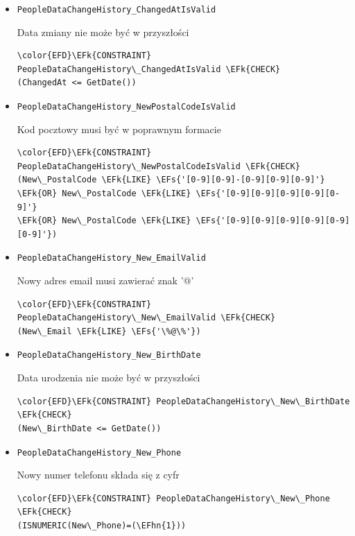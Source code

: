 \documentclass[11pt]{article}
\newcommand{\EFs}[1]{\textcolor{EFs}{#1}} %
\newcommand{\EFk}[1]{\textcolor{EFk}{\textbf{#1}}} %
\newcommand{\EFhn}[1]{\textcolor{EFhn}{#1}} %
\begin{document}
\begin{itemize}
\item \texttt{PeopleDataChangeHistory\_ChangedAtIsValid}

Data zmiany nie może być w przyszłości
\begin{Code}
\begin{Verbatim}
\color{EFD}\EFk{CONSTRAINT} PeopleDataChangeHistory\_ChangedAtIsValid \EFk{CHECK}
(ChangedAt <= GetDate())
\end{Verbatim}
\end{Code}
\item \texttt{PeopleDataChangeHistory\_NewPostalCodeIsValid}

Kod pocztowy musi być w poprawnym formacie
\begin{Code}
\begin{Verbatim}
\color{EFD}\EFk{CONSTRAINT} PeopleDataChangeHistory\_NewPostalCodeIsValid \EFk{CHECK}
(New\_PostalCode \EFk{LIKE} \EFs{'[0-9][0-9]-[0-9][0-9][0-9]'}
\EFk{OR} New\_PostalCode \EFk{LIKE} \EFs{'[0-9][0-9][0-9][0-9][0-9]'}
\EFk{OR} New\_PostalCode \EFk{LIKE} \EFs{'[0-9][0-9][0-9][0-9][0-9][0-9]'})
\end{Verbatim}
\end{Code}
\item \texttt{PeopleDataChangeHistory\_New\_EmailValid}

Nowy adres email musi zawierać znak '@'
\begin{Code}
\begin{Verbatim}
\color{EFD}\EFk{CONSTRAINT} PeopleDataChangeHistory\_New\_EmailValid \EFk{CHECK}
(New\_Email \EFk{LIKE} \EFs{'\%@\%'})
\end{Verbatim}
\end{Code}
\item \texttt{PeopleDataChangeHistory\_New\_BirthDate}

Data urodzenia nie może być w przyszłości
\begin{Code}
\begin{Verbatim}
\color{EFD}\EFk{CONSTRAINT} PeopleDataChangeHistory\_New\_BirthDate \EFk{CHECK}
(New\_BirthDate <= GetDate())
\end{Verbatim}
\end{Code}
\item \texttt{PeopleDataChangeHistory\_New\_Phone}

Nowy numer telefonu składa się z cyfr
\begin{Code}
\begin{Verbatim}
\color{EFD}\EFk{CONSTRAINT} PeopleDataChangeHistory\_New\_Phone \EFk{CHECK}
(ISNUMERIC(New\_Phone)=(\EFhn{1}))
\end{Verbatim}
\end{Code}
\end{itemize}
\end{document}
